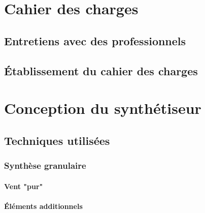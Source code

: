 \documentclass[12pt,a4paper]{report}
\begin{document}

\part{Cahier des charges}

\chapter{Entretiens avec des professionnels}
\chapter{Établissement du cahier des charges}


\part{Conception du synthétiseur}

\chapter{Techniques utilisées}
\section{Synthèse granulaire}
\subsection{Vent "pur"}
\subsection{Éléments additionnels}



\end{document}
